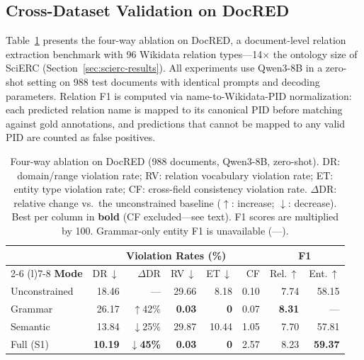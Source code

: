 
\subsection{Cross-Dataset Validation on DocRED}
\label{sec:docred-results}

Table~\ref{tab:docred-ablation} presents the four-way ablation on DocRED,
a document-level relation extraction benchmark with 96 Wikidata relation
types---14$\times$ the ontology size of SciERC
(Section~\ref{sec:scierc-results}).
All experiments use Qwen3-8B in a zero-shot setting on 988 test documents
with identical prompts and decoding parameters.
Relation F1 is computed via name-to-Wikidata-PID normalization:
each predicted relation name is mapped to its canonical PID before
matching against gold annotations, and predictions that cannot be mapped
to any valid PID are counted as false positives.

\begin{table}[t]
\centering
\small
\setlength{\tabcolsep}{3.6pt}
\begin{tabular}{@{}l rrrrr rr@{}}
\toprule
& \multicolumn{5}{c}{\textbf{Violation Rates (\%)}}
& \multicolumn{2}{c}{\textbf{F1}} \\
\cmidrule(lr){2-6} \cmidrule(l){7-8}
\textbf{Mode}
  & DR\,$\downarrow$ & $\Delta$DR
  & RV\,$\downarrow$ & ET\,$\downarrow$ & CF
  & Rel.\,$\uparrow$ & Ent.\,$\uparrow$ \\
\midrule
Unconstrained
  & 18.46 & ---
  & 29.66 & 8.18
  & 0.10
  & 7.74  & 58.15 \\
Grammar
  & 26.17 & $\uparrow$42\%
  & \textbf{0.03} & \textbf{0}
  & 0.07
  & \textbf{8.31}  & --- \\
Semantic
  & 13.84 & $\downarrow$25\%
  & 29.87 & 10.44
  & 1.05
  & 7.70  & 57.81 \\
Full (S1)
  & \textbf{10.19} & $\downarrow$\textbf{45\%}
  & \textbf{0.03} & \textbf{0}
  & 2.57
  & 8.23  & \textbf{59.37} \\
\bottomrule
\end{tabular}
\caption{Four-way ablation on DocRED (988 documents, Qwen3-8B, zero-shot).
DR: domain/range violation rate;
RV: relation vocabulary violation rate;
ET: entity type violation rate;
CF: cross-field consistency violation rate.
$\Delta$DR: relative change vs.\ the unconstrained baseline
($\uparrow$: increase; $\downarrow$: decrease).
Best per column in \textbf{bold} (CF excluded---see text).
F1 scores are multiplied by 100.
Grammar-only entity F1 is unavailable (---).}
\label{tab:docred-ablation}
\end{table}

